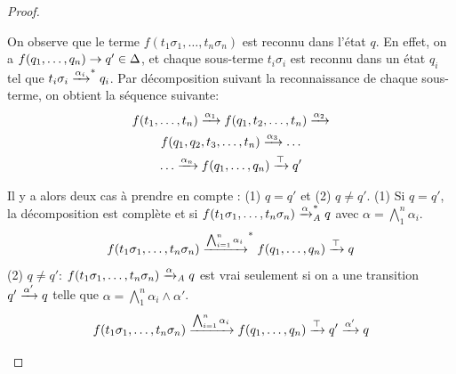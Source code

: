 \begin{proof}
\begin{itemize}
  On  observe que le terme $f(t_1\sigma_1,\dots, t_n\sigma_n)$ est reconnu dans l'état $q$. En effet, on a  $f(q_1,\dots, q_n) \rightarrow q' \in \Delta$, et chaque sous-terme
  $t_i\sigma_i$ est reconnu dans un état $q_i$ tel que $t_i\sigma_i \xrightarrow{\alpha_i}^* q_i$. 
  Par décomposition suivant la reconnaissance de chaque sous-terme, on obtient la séquence suivante:
  \begin{multline*}
    \label{eq:1}
    f(t_1,\dots, t_n) \xrightarrow{\alpha_1} f(q_1, t_2, \dots, t_n) \xrightarrow{\alpha_2} \\
    f(q_1, q_2, t_3, \dots, t_n) \xrightarrow{\alpha_3} \dots \\
    \dots \xrightarrow{\alpha_n} f(q_1,\dots, q_n) \xrightarrow{\top} q'
  \end{multline*}

  Il y a alors deux cas à prendre en compte : (1) $q=q'$ et (2) $q \not = q'$.
  (1) Si $q=q'$, la décomposition est complète et si $f(t_1\sigma_1,\dots, t_n\sigma_n) \xrightarrow{\alpha}_\mathit A^* q$ avec $\alpha = \bigwedge_1^n \alpha_i$.
  \[f(t_1\sigma_1,\dots, t_n\sigma_n) \xrightarrow{\bigwedge_{i = 1}^n \alpha_i}^* f(q_1,\dots,q_n) \xrightarrow{\top} q\]
  (2) $q \not = q'$: $f(t_1\sigma_1,\dots, t_n\sigma_n) \xrightarrow{\alpha}_\mathit A q$ est vrai seulement si on a une transition $q' \xrightarrow{\alpha'} q$
  telle que $\alpha = \bigwedge_1^n \alpha_i \land \alpha'$.
  \[f(t_1\sigma_1,\dots, t_n\sigma_n) \xrightarrow{\bigwedge_{i = 1}^n \alpha_i} f(q_1,\dots,q_n) \xrightarrow{\top} q' \xrightarrow{\alpha'} q\]

\end{itemize}
\end{proof}
